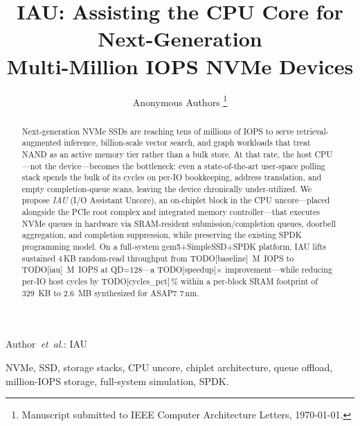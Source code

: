 \documentclass[journal]{IEEEtran}
\begin{document}
\title{IAU: Assisting the CPU Core for Next-Generation\\Multi-Million IOPS NVMe Devices}

\author{%
  Anonymous Authors%
  \thanks{Manuscript submitted to IEEE Computer Architecture Letters,
  \today.}%
}

%
{Author~\MakeLowercase{\textit{et~al.}}: IAU}

\maketitle

\begin{abstract}
Next-generation NVMe SSDs are reaching tens of millions of IOPS to serve
retrieval-augmented inference, billion-scale vector search, and
graph workloads that treat NAND as an active memory tier rather than a
bulk store. At that rate, the host CPU---not the device---becomes the
bottleneck: even a state-of-the-art user-space polling stack spends the
bulk of its cycles on per-IO bookkeeping, address translation, and
empty completion-queue scans, leaving the device chronically
under-utilized. We propose \emph{IAU} (I/O Assistant Uncore), an
on-chiplet block in the CPU uncore---placed alongside the PCIe root
complex and integrated memory controller---that executes NVMe queues in
hardware via SRAM-resident submission/completion queues, doorbell
aggregation, and completion suppression, while preserving the existing
SPDK programming model. On a full-system gem5+SimpleSSD+SPDK platform,
IAU lifts sustained 4\,KB random-read throughput from
TODO[baseline]~M~IOPS to TODO[iau]~M~IOPS at QD=128---a
TODO[speedup]$\times$ improvement---while reducing per-IO host cycles
by TODO[cycles\_pct]\,\% within a per-block SRAM footprint of 329~KB to
2.6~MB synthesized for ASAP7 7\,nm.
\end{abstract}

\begin{IEEEkeywords}
NVMe, SSD, storage stacks, CPU uncore, chiplet architecture, queue
offload, million-IOPS storage, full-system simulation, SPDK.
\end{IEEEkeywords}
\end{document}
